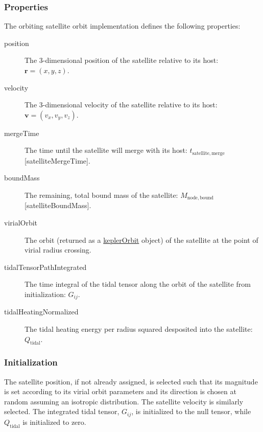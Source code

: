 \subsubsection{Properties}

The orbiting satellite orbit implementation defines the following properties:
\begin{description}
 \item [{\normalfont \ttfamily position}] The 3-dimensional position of the satellite relative to its host: $\mathbf{r}=(x,y,z)$.
 \item [{\normalfont \ttfamily velocity}] The 3-dimensional velocity of the satellite relative to its host: $\mathbf{v}=(v_x,v_y,v_z)$.
 \item [{\normalfont \ttfamily mergeTime}] The time until the satellite will merge with its host: $t_\mathrm{satellite, merge}$ [{\normalfont \ttfamily satelliteMergeTime}].
 \item [{\normalfont \ttfamily boundMass}] The remaining, total bound mass of the satellite: $M_\mathrm{node,bound}$ [{\normalfont \ttfamily satelliteBoundMass}].
 \item[{\normalfont \ttfamily virialOrbit}] The orbit (returned as a \href{https://github.com/galacticusorg/galacticus/releases/download/bleeding-edge/Galacticus_Development.pdf\#sec.KeplerOrbits}{\normalfont \ttfamily keplerOrbit} object) of the satellite at the point of virial radius crossing.
 \item[{\normalfont \ttfamily tidalTensorPathIntegrated}] The time integral of the tidal tensor along the orbit of the satellite from initialization: $G_{ij}$.
 \item[{\normalfont \ttfamily tidalHeatingNormalized}] The tidal heating energy per radius squared desposited into the satellite: $Q_\mathrm{tidal}$.
\end{description}

\subsubsection{Initialization}

The satellite position, if not already assigned, is selected such that its magnitude is set according to its virial orbit parameters and its direction is chosen at random assuming an isotropic distribution.  The satellite velocity is similarly selected.  The integrated tidal tensor, $G_{ij}$, is initialized to the null tensor, while $Q_\mathrm{tidal}$ is initialized to zero.

